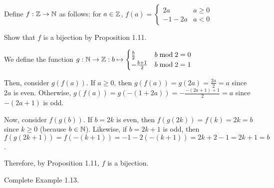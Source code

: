 \documentclass[class=math239,notes]{agony}
\begin{document}
\begin{xca}
  Define $f : \mathbb{Z} \to \mathbb{N}$ as follows: for $a \in \mathbb{Z}$,
  $f(a) = \begin{cases}
      2a    & a \geq 0 \\
      -1-2a & a < 0
    \end{cases}$

  Show that $f$ is a bijection by Proposition 1.11.
\end{xca}
\begin{prf}
  We define the function $g : \mathbb{N} \to \mathbb{Z} : b \mapsto \begin{cases}
      \frac{b}{2}    & b \bmod 2 = 0 \\
      -\frac{b+1}{2} & b \bmod 2 = 1
    \end{cases}$

  Then, consider $g(f(a))$.
  If $a \geq 0$, then $g(f(a)) = g(2a) = \frac{2a}{2} = a$ since $2a$ is even.
  Otherwise, $g(f(a)) = g(-(1+2a)) = -\frac{-(2a+1)+1}{2} = a$ since $-(2a+1)$ is odd.

  Now, consider $f(g(b))$.
  If $b = 2k$ is even, then $f(g(2k)) = f(k) = 2k = b$ since $k \geq 0$ (because $b \in \mathbb{N}$).
  Likewise, if $b = 2k+1$ is odd, then $f(g(2k+1)) = f(-(k+1)) = -1-2(-(k+1)) = 2k+2-1 = 2k+1 = b$.

  Therefore, by Proposition 1.11, $f$ is a bijection.
\end{prf}

\begin{xca}
  Complete Example 1.13.
\end{xca}
\end{document}
